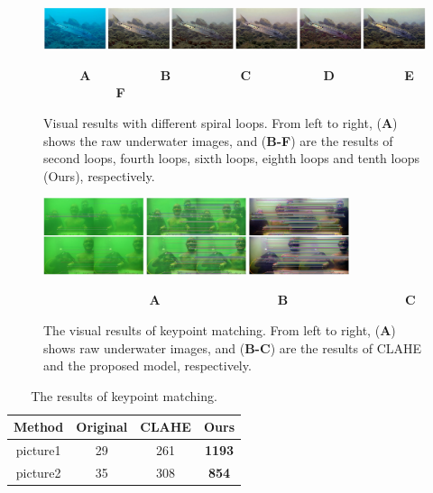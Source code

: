 \documentclass[utf8]{FrontiersinHarvard} %
\begin{document}
\begin{figure}[htbp]
\begin{center}
\includegraphics[width=1\textwidth]{FSpiralGAN_frontiers/onepicture/abalation_loop300.jpg}
\end{center}
$~~~~~~~~~~~~~$\textbf{A}$~~~~~~~~~~~~~~~~~~~~~~~~~$\textbf{B}$~~~~~~~~~~~~~~~~~~~~~~~~~$\textbf{C}$~~~~~~~~~~~~~~~~~~~~~~~~~~$\textbf{D}$~~~~~~~~~~~~~~~~~~~~~~~~~$\textbf{E}$~~~~~~~~~~~~~~~~~~~~~~~~~~$\textbf{F}
 \caption{Visual results with different spiral loops. From left to right, (\textbf{A}) shows the raw underwater images, and (\textbf{B-F}) are the results of second loops, fourth loops, sixth loops, eighth loops and tenth loops (Ours), respectively. \label{fig:abalation-loop}}
\end{figure}

\begin{figure}[htbp]
\begin{center}
\includegraphics[width=0.8\textwidth]{FSpiralGAN_frontiers/onepicture/SIFT300.jpg}
\end{center}
$~~~~~~~~~~~~~~~~~~~~~~~~~~~~~~~~~~~~~~$\textbf{A}$~~~~~~~~~~~~~~~~~~~~~~~~~~~~~~~~~~~~~~~~~~$\textbf{B}$~~~~~~~~~~~~~~~~~~~~~~~~~~~~~~~~~~~~~~~~~~$\textbf{C}
 \caption{The visual results of keypoint matching. From left to right, (\textbf{A}) shows raw underwater images, and (\textbf{B-C}) are the results of CLAHE and the proposed model, respectively. \label{fig:comparison-SIFT}}
\end{figure}

\begin{table}[htbp]\normalsize
\centering
\setlength\tabcolsep{10pt}
\caption{The results of keypoint matching.}
\begin{tabular}{c|ccc}
\hline  
Method&Original&CLAHE&Ours\\
\hline 
picture1&29&261&\textbf{1193}\\
\hline 
picture2&35&308&\textbf{854}\\
\hline 
\end{tabular}
\label{tbl:comparison-SIFT}
\end{table}
\end{document}
